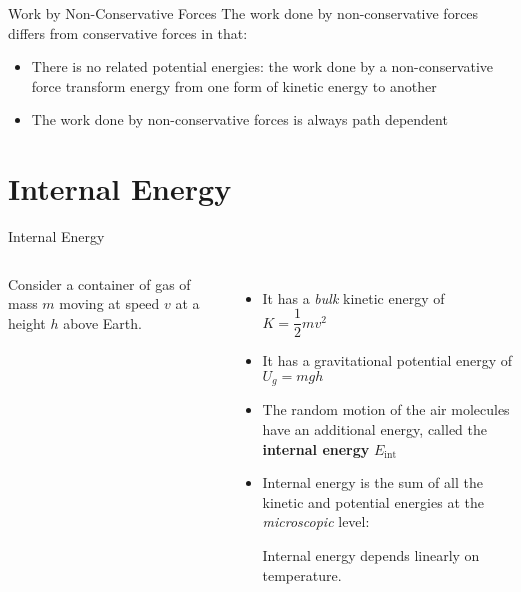\documentclass[12pt,compress,aspectratio=169]{beamer}
\begin{document}
\begin{frame}{Work by Non-Conservative Forces}
  The work done by non-conservative forces differs from conservative forces in
  that:
  \begin{itemize}
  \item There is no related potential energies: the work done by a
    non-conservative force transform energy from one form of kinetic energy to
    another
  \item The work done by non-conservative forces is always path dependent
  \end{itemize}
\end{frame}




\section{Internal Energy}

\begin{frame}{Internal Energy}
  \begin{columns}

    Consider a container of gas of mass $m$ moving at speed $v$ at a height $h$
    above Earth.
    \begin{itemize}
    \item It has a \emph{bulk} kinetic energy of $K=\dfrac12 mv^2$
    \item It has a gravitational potential energy of $U_g=mgh$
    \item The random motion of the air molecules have an additional energy,
      called the \textbf{internal energy} $E_\text{int}$%
    \item Internal energy is the sum of all the kinetic and potential energies
      at the \emph{microscopic} level:

      
      \vspace{-.15in}Internal energy depends linearly on temperature.
    \end{itemize}
  \end{columns}
\end{frame}
\end{document}
